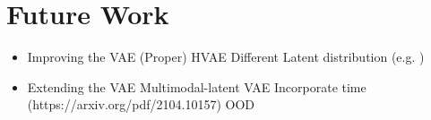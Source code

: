 \chapter{Future Work}\label{chapter:future_work}


\begin{itemize}
    \item Improving the VAE
          \subitem (Proper) HVAE
          \subitem Different Latent distribution (e.g. )
    \item Extending the VAE
          \subitem Multimodal-latent VAE
          \subitem Incorporate time (https://arxiv.org/pdf/2104.10157)
          \subitem OOD
\end{itemize}